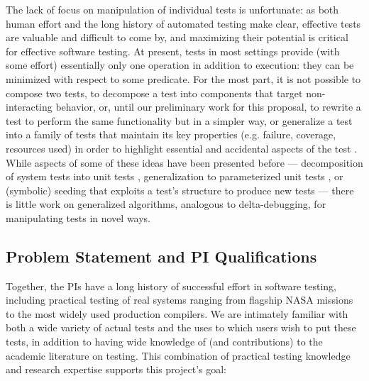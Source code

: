 The lack of focus on manipulation of individual tests is unfortunate:
as both human effort and the long history of automated testing make
clear, effective tests are valuable and difficult to come by, and
maximizing their potential is critical for effective software testing.  At
present, tests in most settings provide (with some effort) essentially
only one operation in addition to execution: they can be minimized with respect to some
predicate.  For the most part, it is not possible to compose two
tests, to decompose a test into components that target non-interacting
behavior, or, until our preliminary work for this proposal, to rewrite a test to perform the same functionality but in a
simpler way, or generalize a test into a family of tests that
maintain its key properties (e.g. failure, coverage, resources used)
in order to highlight essential and accidental aspects of the test \cite{OneTest}.
While aspects of some of these ideas have been presented before ---
decomposition of system tests into unit tests \cite{OrsoKennedy05WODA,
  SaffETAL05ASE, JordeETAL08ASE, ElbaumETAL06FSE}, generalization to
parameterized unit tests \cite{TaoParam,tillmann2005parameterized}, or (symbolic) seeding that exploits a test's
structure to
produce new tests \cite{Jin:2012:BRF:2337223.2337279,Person:2011:DIS:1993498.1993558,Marinescu:2012:MTS:2337223.2337308,BugRedux,STVR_seeding} --- there is little work on
generalized algorithms, analogous to delta-debugging, for manipulating
tests in novel ways.  

\subsection{Problem Statement and PI Qualifications}

Together, the PIs have a long history of successful effort in software
testing, including practical testing of real systems ranging from
flagship NASA missions to the most widely used production compilers.
We are intimately familiar with both a wide variety of actual tests
and the uses to which users wish to put these tests, in addition to
having wide knowledge of (and contributions) to the academic
literature on testing.  This combination of practical testing
knowledge and research expertise supports this project's goal:

{\center{}\vskip 0.1in}


